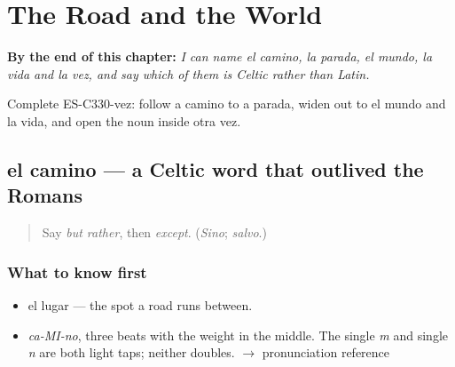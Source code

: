 
\chapter{The Road and the World}
\label{ch:camino-y-vez}

\begin{chapteropening}
\textbf{By the end of this chapter:} \emph{I can name el camino, la parada, el mundo, la vida and la vez, and say which of them is Celtic rather than Latin.}

Complete ES-C330-vez: follow a camino to a parada, widen out to el mundo and la vida, and open the noun inside otra vez.
\end{chapteropening}

\section[el camino]{el camino — a Celtic word that outlived the Romans}

\label{lesson:ES-C330-camino}



\begin{quote}
Say \emph{but rather}, then \emph{except}. (\emph{Sino}; \emph{salvo}.)
\end{quote}

\subsection*{What to know first}
\begin{itemize}
\raggedright
  \item el lugar — the spot a road runs between.
\end{itemize}

\begin{sounds}
\begin{itemize}
\raggedright
  \item \emph{ca-MI-no}, three beats with the weight in the middle. The single \emph{m} and single \emph{n} are both light taps; neither doubles. $\to$ pronunciation reference
\end{itemize}
\end{sounds}

